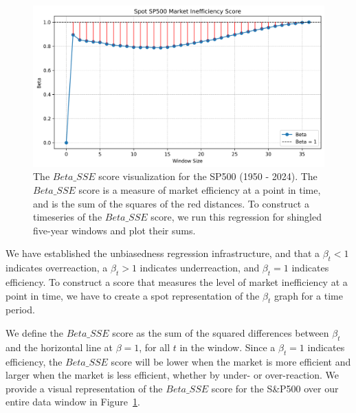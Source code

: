 \begin{figure}[h!]
    \centering
    \includegraphics[width=1\textwidth]{../figs/Spot SP500 Market Inefficiency Score.png}
    \caption{The $Beta\_SSE$ score visualization for the SP500 (1950 - 2024). The $Beta\_SSE$ score is a measure of market efficiency at a point in time, and is the sum of 
    the squares of the red distances. To construct a timeseries of the $Beta\_SSE$ score, we run this regression for shingled five-year windows and plot their sums.}
    \label{fig:sp_500_unbiasedness_sse}
\end{figure}

We have established the unbiasedness regression infrastructure, and that a $\beta_t < 1$ indicates overreaction, a $\beta_t > 1$ indicates underreaction, and $\beta_t = 1$ indicates efficiency.
To construct a score that measures the level of market inefficiency at a point in time, we have to create a spot representation of the $\beta_t$ graph for a time period.

We define the $Beta\_SSE$ score as the sum of the squared differences between $\beta_t$ and the horizontal line at $\beta = 1$, for all $t$ in the window.
Since a $\beta_t = 1$ indicates efficiency, the $Beta\_SSE$ score will be lower when the market is more efficient and larger when the market is less efficient, whether by under- or over-reaction.
We provide a visual representation of the $Beta\_SSE$ score for the S\&P500 over our entire data window in Figure~\ref{fig:sp_500_unbiasedness_sse}.

